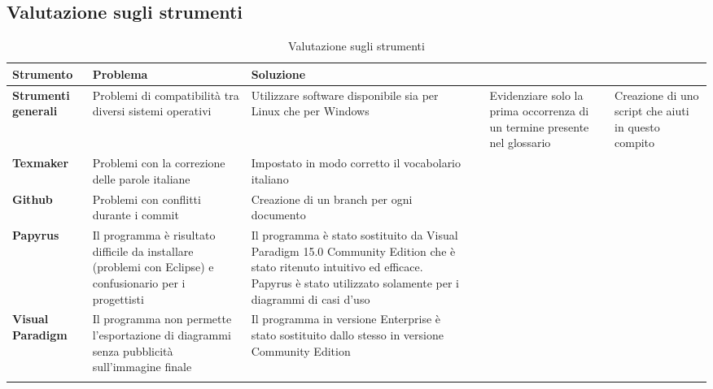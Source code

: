 \newpage

	\subsection{Valutazione sugli strumenti}
	\begin{center}	
	
   			\begin{longtable}{ | >{\centering\arraybackslash}m{2.5cm} | >{\raggedright\arraybackslash}p{5cm} | >{\raggedright\arraybackslash}p{5.5cm} | }
        
        	\hline
        		\textbf{Strumento} & \textbf{Problema} & \textbf{Soluzione} \\ \hline
        	\endhead
        	
        	\textbf{Strumenti generali} &  Problemi di compatibilità tra diversi sistemi operativi
										&   Utilizzare software disponibile sia per Linux che per Windows
								& 
						 	   	& Evidenziare solo la prima occorrenza di un termine presente nel glossario
							 	& Creazione di uno script che aiuti in questo compito
								 
								\\  \hline
			\textbf{Texmaker} & Problemi con la correzione delle parole italiane
					& Impostato in modo corretto il vocabolario italiano
					\\ \hline
			\textbf{Github} & Problemi con conflitti durante i commit
					& Creazione di un branch per ogni documento
					\\ \hline
			\textbf{Papyrus} & Il programma è risultato difficile da installare (problemi con Eclipse) e confusionario per i progettisti & Il programma è stato sostituito da Visual Paradigm 15.0 Community Edition che è stato ritenuto intuitivo ed efficace. Papyrus è stato utilizzato solamente per i diagrammi di casi d'uso\\ \hline
			\textbf{Visual Paradigm} & Il programma non permette l'esportazione di diagrammi senza pubblicità sull'immagine finale & Il programma in versione Enterprise è stato sostituito dallo stesso in versione Community Edition\\ \hline
				
				
			\caption[Valutazione sugli strumenti]{Valutazione sugli strumenti}
			\end{longtable}
	
			\end{center}
